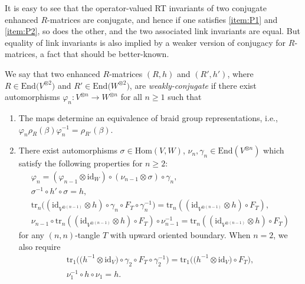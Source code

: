 \documentclass[pdftex]{sigma}
\makeatletter
\numberwithin{equation}{section}
\theoremstyle{definition}
\def\namedlabel#1#2{\begingroup
 #2%
 \def\@currentlabel{#2}%
 \phantomsection\label{#1}\endgroup
}
\makeatother
\begin{document}
It is easy to see that the operator-valued RT invariants of two conjugate
enhanced $R$-matrices are conjugate, and hence if one satisfies \eqref{item:P1}
and \eqref{item:P2},
so does the other, and the two associated link invariants are equal.
But equality of link invariants is also implied by a weaker version of conjugacy
for $R$-matrices, a fact that should be better-known.

We say that two enhanced $R$-matrices $(R,h)$ and $(R',h')$, where
$R \in \mathrm{End}\bigl(V^{\otimes 2}\bigr)$ and $R' \in \mathrm{End}\bigl(W^{\otimes 2}\bigr)$, are
\emph{weakly-conjugate} if there exist automorphisms
$\varphi_n\colon V^{\otimes n}\to W^{\otimes n}$ for all $n\geq 1$ such that
\begin{enumerate}\itemsep=0pt \setlength{\leftskip}{0.26cm}
\item[(\namedlabel{item:BC1}{$BC_1$})]
 The maps determine an equivalence of braid group representations, i.e.,
$\varphi_n \rho_R(\beta) \varphi_n^{-1}= \rho_{R'}(\beta)$.
\item[(\namedlabel{item:BC2}{$BC_2$})]
 There exist automorphisms $\sigma \in \mathrm{Hom}(V,W)$, $\nu_{n},\gamma_n\in \mathrm{End}(V^{\otimes n})$
 which satisfy the following properties for $n\geq 2$:
\begin{gather}
 \varphi_n=(\varphi_{n-1}\otimes \mathrm{id}_W)\circ (\nu_{n-1} \otimes \sigma)\circ\gamma_n,
 \label{eq.phin}
 \\
 \sigma^{-1} \circ h' \circ\sigma = h, \label{eq.sn}
 \\
 \mathrm{tr}_n\bigl((\mathrm{id}_{V^{\otimes (n-1)}}\otimes h)\circ \gamma_n\circ F_T\circ \gamma_n^{-1}\bigr)
 =\mathrm{tr}_n((\mathrm{id}_{V^{\otimes (n-1)}}\otimes h)\circ F_T),\label{eq.gn}
 \\
 \nu_{n-1} \circ \mathrm{tr}_n((\mathrm{id}_{V^{\otimes (n-1)}}\otimes h)\circ F_T)\circ \nu_{n-1}^{-1}
 =\mathrm{tr}_n((\mathrm{id}_{V^{\otimes (n-1)}}\otimes h)\circ F_T)\label{eq.nun}
\end{gather}
for any $(n,n)$-tangle $T$ with upward oriented boundary. When $n=2$, we also require
\begin{gather}
 \mathrm{tr}_1\bigl(\bigl(h^{-1}\otimes\mathrm{id}_V\bigr)\circ \gamma_2\circ F_T\circ \gamma_2^{-1}\bigr)
 =
 \mathrm{tr}_1\bigl(\bigl(h^{-1}\otimes\mathrm{id}_V\bigr)\circ F_T\bigr), \label{eq.g2}
 \\
 \nu_1^{-1} \circ h \circ \nu_1=h .\label{eq.n1}
\end{gather}
\end{enumerate}
\end{document}
